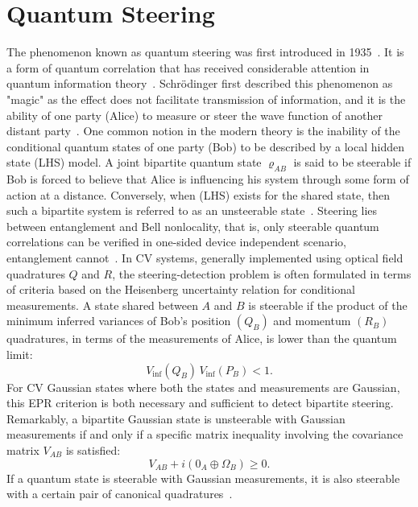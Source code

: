 \section{Quantum Steering}
The phenomenon known as quantum steering was first introduced in 1935~\cite{Schrodinger1935}. It is a form of quantum correlation that has received considerable attention in quantum information theory~\cite{WisemanJonesDoherty2007}. Schr\"{o}dinger first described this phenomenon as "magic" as the effect does not facilitate transmission of information, and it is the ability of one party (Alice) to measure or steer the wave function of another distant party~\cite{Uola2020}.
One common notion in the modern theory is the inability of the conditional quantum states of one party (Bob) to be described by a local hidden state (LHS) model. A joint bipartite quantum state $\varrho_{AB}$ 
is said to be steerable if Bob is forced to believe that Alice is influencing his system through some form of action at a distance. Conversely, when (LHS) exists for the shared state, then such a bipartite system is referred to as an unsteerable state~\cite{ Uola2020,Wang2015}. Steering lies between entanglement and Bell nonlocality, that is, only steerable quantum correlations can be verified in one-sided device independent scenario, entanglement cannot~\cite{Uola2020,Wang2015}.
In CV systems, generally implemented using optical field quadratures $Q$ and $R$, the steering-detection problem is often formulated in terms of criteria based on the Heisenberg uncertainty relation for conditional measurements. A state shared between $A$ and $B$ is steerable if the product of the minimum inferred variances of Bob's position $(Q_B)$ and momentum $(R_B)$ quadratures, in terms of the measurements of Alice, is lower than the quantum limit: ~\cite{Reid2013,Uola2020}
\begin{equation}
V_{\mathrm{inf}}(Q_B)\,V_{\mathrm{inf}}(P_B) < 1.
\end{equation}
For CV Gaussian states where both the states and measurements are Gaussian, this EPR criterion is both necessary and sufficient to detect bipartite steering\cite{Reid2013}. Remarkably, a bipartite Gaussian state is unsteerable with Gaussian measurements if and only if a specific matrix inequality involving the covariance matrix $V_{AB}$ is satisfied:
\begin{equation}
	V_{AB} + i\left( 0_{A} \oplus \Omega_{B} \right) \ge 0 .
\end{equation}
If a quantum state is steerable with Gaussian measurements, it is also steerable with a certain pair of canonical quadratures~\cite{Uola2020}.
